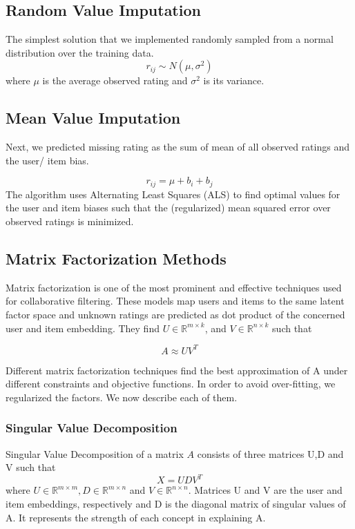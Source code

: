 \documentclass[10pt,conference,compsocconf]{IEEEtran}
\begin{document}
\subsection{Random Value Imputation}
The simplest solution that we implemented randomly sampled from a normal distribution over the training data.
$$r_{ij} \sim N(\mu, \sigma^{2})$$ where $\mu$ is the average observed rating and $\sigma^{2}$ is its variance.

\subsection{Mean Value Imputation}
Next, we predicted missing rating as the sum of mean of all observed ratings and the user/ item bias.

    $$r_{ij} = \mu + b_{i} + b_{j}$$
The algorithm uses Alternating Least Squares (ALS)  to find optimal values for the user and item biases such that the (regularized) mean squared error over observed ratings is minimized.

\subsection{Matrix Factorization Methods}
Matrix factorization is one of the most prominent and effective techniques used for collaborative filtering. These models map users and items to the same latent factor space and unknown ratings are predicted as dot product of the concerned user and item embedding. They find $U \in \mathbb{R}^{m \times k}$, and $V \in \mathbb{R}^{n \times k}$ such that 

    $$A \approx UV^T$$

Different matrix factorization techniques find the best approximation of A under different constraints and objective functions. In order to avoid over-fitting, we regularized the factors. We now describe each of them.

\subsubsection{Singular Value Decomposition}
Singular Value Decomposition \cite{koren, RSH} of a matrix $A$ consists of three matrices U,D and V such that
    $$X = UDV^T$$
where $U \in \mathbb{R}^{m \times m}, D \in \mathbb{R}^{m \times n}$ and  $V \in \mathbb{R}^{n \times n}$. Matrices U and V are the user and item embeddings, respectively and D is the diagonal matrix of singular values of A. It represents the strength of each concept in explaining A. 
\end{document}
